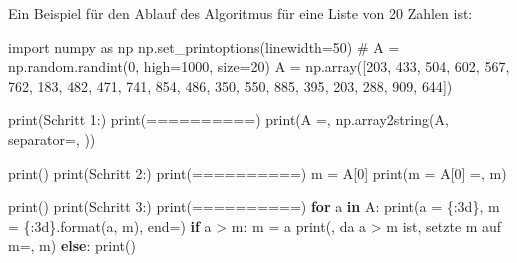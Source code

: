 \documentclass[
  letterpaper,
  DIV=11,
  numbers=noendperiod]{scrreprt}
\newenvironment{Shaded}{\begin{snugshade}}{\end{snugshade}}
\newcommand{\BuiltInTok}[1]{\textcolor[rgb]{0.00,0.23,0.31}{#1}}
\newcommand{\CommentTok}[1]{\textcolor[rgb]{0.37,0.37,0.37}{#1}}
\newcommand{\ControlFlowTok}[1]{\textcolor[rgb]{0.00,0.23,0.31}{\textbf{#1}}}
\newcommand{\DecValTok}[1]{\textcolor[rgb]{0.68,0.00,0.00}{#1}}
\newcommand{\ImportTok}[1]{\textcolor[rgb]{0.00,0.46,0.62}{#1}}
\newcommand{\KeywordTok}[1]{\textcolor[rgb]{0.00,0.23,0.31}{\textbf{#1}}}
\newcommand{\NormalTok}[1]{\textcolor[rgb]{0.00,0.23,0.31}{#1}}
\newcommand{\OperatorTok}[1]{\textcolor[rgb]{0.37,0.37,0.37}{#1}}
\newcommand{\SpecialCharTok}[1]{\textcolor[rgb]{0.37,0.37,0.37}{#1}}
\newcommand{\StringTok}[1]{\textcolor[rgb]{0.13,0.47,0.30}{#1}}
\begin{document}
Ein Beispiel für den Ablauf des Algoritmus für eine Liste von 20 Zahlen
ist:

\begin{Shaded}
\begin{Highlighting}[]
\ImportTok{import}\NormalTok{ numpy }\ImportTok{as}\NormalTok{ np}
\NormalTok{np.set\_printoptions(linewidth}\OperatorTok{=}\DecValTok{50}\NormalTok{)}
\CommentTok{\# A = np.random.randint(0, high=1000, size=20)}
\NormalTok{A }\OperatorTok{=}\NormalTok{ np.array([}\DecValTok{203}\NormalTok{, }\DecValTok{433}\NormalTok{, }\DecValTok{504}\NormalTok{, }\DecValTok{602}\NormalTok{, }\DecValTok{567}\NormalTok{, }\DecValTok{762}\NormalTok{, }\DecValTok{183}\NormalTok{, }\DecValTok{482}\NormalTok{, }\DecValTok{471}\NormalTok{, }\DecValTok{741}\NormalTok{, }\DecValTok{854}\NormalTok{, }\DecValTok{486}\NormalTok{, }\DecValTok{350}\NormalTok{, }\DecValTok{550}\NormalTok{, }\DecValTok{885}\NormalTok{, }\DecValTok{395}\NormalTok{, }\DecValTok{203}\NormalTok{, }\DecValTok{288}\NormalTok{, }\DecValTok{909}\NormalTok{, }\DecValTok{644}\NormalTok{])}

\BuiltInTok{print}\NormalTok{(}\StringTok{\textquotesingle{}Schritt 1:\textquotesingle{}}\NormalTok{)}
\BuiltInTok{print}\NormalTok{(}\StringTok{\textquotesingle{}==========\textquotesingle{}}\NormalTok{)}
\BuiltInTok{print}\NormalTok{(}\StringTok{\textquotesingle{}A =\textquotesingle{}}\NormalTok{, np.array2string(A, separator}\OperatorTok{=}\StringTok{\textquotesingle{}, \textquotesingle{}}\NormalTok{))}

\BuiltInTok{print}\NormalTok{()}
\BuiltInTok{print}\NormalTok{(}\StringTok{\textquotesingle{}Schritt 2:\textquotesingle{}}\NormalTok{)}
\BuiltInTok{print}\NormalTok{(}\StringTok{\textquotesingle{}==========\textquotesingle{}}\NormalTok{)}
\NormalTok{m }\OperatorTok{=}\NormalTok{ A[}\DecValTok{0}\NormalTok{]}
\BuiltInTok{print}\NormalTok{(}\StringTok{\textquotesingle{}m = A[0] =\textquotesingle{}}\NormalTok{, m)}

\BuiltInTok{print}\NormalTok{()}
\BuiltInTok{print}\NormalTok{(}\StringTok{\textquotesingle{}Schritt 3:\textquotesingle{}}\NormalTok{)}
\BuiltInTok{print}\NormalTok{(}\StringTok{\textquotesingle{}==========\textquotesingle{}}\NormalTok{)}
\ControlFlowTok{for}\NormalTok{ a }\KeywordTok{in}\NormalTok{ A:}
    \BuiltInTok{print}\NormalTok{(}\StringTok{\textquotesingle{}a = }\SpecialCharTok{\{:3d\}}\StringTok{, m = }\SpecialCharTok{\{:3d\}}\StringTok{\textquotesingle{}}\NormalTok{.}\BuiltInTok{format}\NormalTok{(a, m), end}\OperatorTok{=}\StringTok{\textquotesingle{}\textquotesingle{}}\NormalTok{)}
    \ControlFlowTok{if}\NormalTok{ a }\OperatorTok{\textgreater{}}\NormalTok{ m:}
\NormalTok{        m }\OperatorTok{=}\NormalTok{ a}
        \BuiltInTok{print}\NormalTok{(}\StringTok{\textquotesingle{}, da a \textgreater{} m ist, setzte m auf m=\textquotesingle{}}\NormalTok{, m)}
    \ControlFlowTok{else}\NormalTok{:}
        \BuiltInTok{print}\NormalTok{()}


\end{Highlighting}
\end{Shaded}
\end{document}
